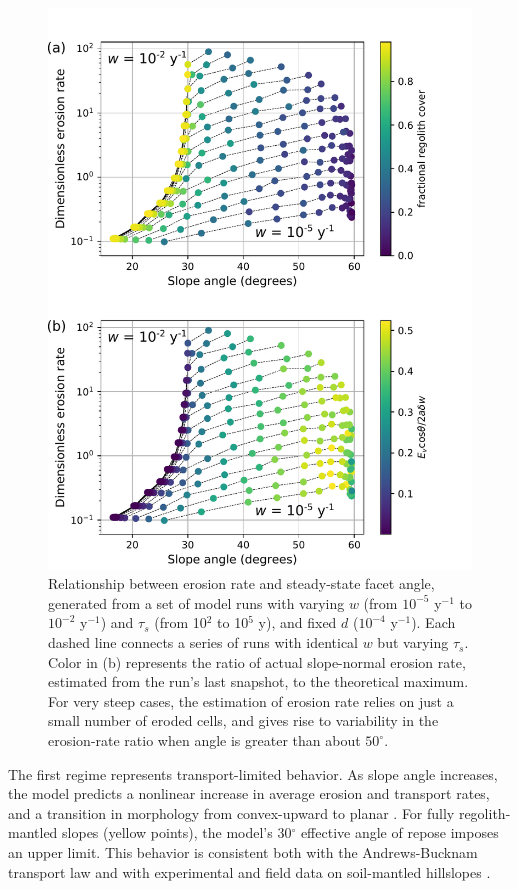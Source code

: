 \begin{figure}[ht!]
\centerline{\includegraphics[scale=0.75]{Figures/ero_rate_vs_slope_angle.pdf}}
\caption{Relationship between erosion rate and steady-state facet angle, generated from a set of model runs with varying $w$ (from $10^{-5}$ y$^{-1}$ to $10^{-2}$ y$^{-1}$) and $\tau_s$ (from 10$^2$ to 10$^5$ y), and fixed $d$ ($10^{-4}$ y$^{-1}$). Each dashed line connects a series of runs with identical $w$ but varying $\tau_s$. Color in (b) represents the ratio of actual slope-normal erosion rate, estimated from the run's last snapshot, to the theoretical maximum. For very steep cases, the estimation of erosion rate relies on just a small number of eroded cells, and gives rise to variability in the erosion-rate ratio when angle is greater than about $50^\circ$.}
\label{fig:eroslope}
\end{figure}

The first regime represents transport-limited behavior. As slope angle increases, the model predicts a nonlinear increase in average erosion and transport rates, and a transition in morphology from convex-upward to planar \citep{tucker2018lattice}. For fully regolith-mantled slopes (yellow points), the model's 30$^\circ$ effective angle of repose imposes an upper limit. This behavior is consistent both with the Andrews-Bucknam transport law \citep{andrews1987fitting,roering1999evidence} and with experimental and field data on soil-mantled hillslopes \citep{roering2001hillslope,binnie2007tectonic,roering2008well,ouimet2009beyond,stock2009spatial,dibiase2012hillslope}.

